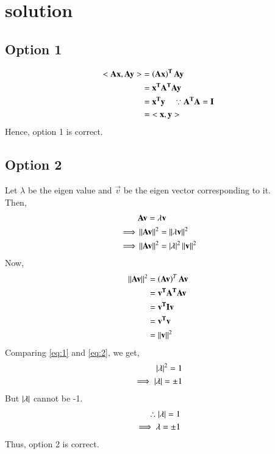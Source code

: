 \documentclass[journal,12pt,twocolumn]{IEEEtran}
\begin{document}
\section{solution}
\subsection{Option 1}
\begin{align}
    \mathbf{<Ax,Ay>}&= \mathbf{\left(Ax\right)^T Ay} \\
    &=\mathbf{ x^T A^T Ay}\\
    &= \mathbf{x^T y} \quad\because \mathbf{A^TA = I}\\
    &= \mathbf{<x,y>}
\end{align}
Hence, option 1 is correct.
\subsection{Option 2}
Let $\lambda$ be the eigen value and $\vec v$ be the eigen vector corresponding to it.\\
Then,
\begin{align}
    &\mathbf{Av} = \lambda\mathbf v\\
    \implies & \left\lVert\mathbf{Av}\right\rVert^2 = \left\lVert\lambda\mathbf v\right\rVert^2\\
    \implies & \left\lVert\mathbf{Av}\right\rVert^2 = \left\vert\lambda\right\vert^2 \left\lVert\mathbf v\right\rVert^2 \label{eq:1}
\end{align}
Now,
\begin{align}
    \left\lVert\mathbf{Av}\right\rVert^2 &= \left(\mathbf{Av}\right)^T \mathbf{Av}\\
    &= \mathbf{v ^TA^TAv} \\
    &= \mathbf{v^TIv}\\
    &=\mathbf{v^Tv}\\
    &=\left\lVert\mathbf v\right\rVert^2 \label{eq:2}
\end{align}
Comparing \eqref{eq:1} and \eqref{eq:2}, we get, 
\begin{align}
    \left\vert\lambda\right\vert^2 =1 \\
    \implies\left\vert\lambda\right\vert= \pm 1
\end{align}
But $\left\vert\lambda\right\vert$ cannot be -1.
\begin{align}
    \therefore \left\vert\lambda\right\vert=1\\
    \implies \lambda = \pm 1
\end{align}
Thus, option 2 is correct.
\end{document}
